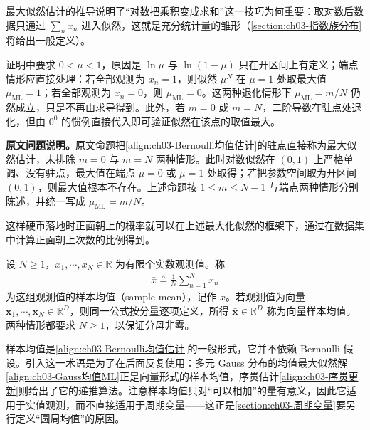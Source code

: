 \documentclass[../../main.tex]{subfiles}
\begin{document}
\begin{remark}
最大似然估计的推导说明了“对数把乘积变成求和”这一技巧为何重要：取对数后数据只通过 $\sum_n x_n$ 进入似然，这就是充分统计量的雏形（\cref{section:ch03-指数族分布}将给出一般定义）。

证明中要求 $0<\mu<1$，原因是 $\ln\mu$ 与 $\ln(1-\mu)$ 只在开区间上有定义；端点情形应直接处理：若全部观测为 $x_n=1$，则似然 $\mu^{N}$ 在 $\mu=1$ 处取最大值 $\mu_{\mathrm{ML}}=1$；若全部观测为 $x_n=0$，则 $\mu_{\mathrm{ML}}=0$。这两种退化情形下 $\mu_{\mathrm{ML}}=m/N$ 仍然成立，只是不再由求导得到。此外，若 $m=0$ 或 $m=N$，二阶导数在驻点处退化，但由 $0^{0}$ 的惯例直接代入即可验证似然在该点的取值最大。

\textbf{原文问题说明。}原文命题把\eqref{align:ch03-Bernoulli均值估计}的驻点直接称为最大似然估计，未排除 $m=0$ 与 $m=N$ 两种情形。此时对数似然在 $(0,1)$ 上严格单调、没有驻点，最大值在端点 $\mu=0$ 或 $\mu=1$ 处取得；若把参数空间取为开区间 $(0,1)$，则最大值根本不存在。上述命题按 $1\leqslant m\leqslant N-1$ 与端点两种情形分别陈述，并统一写成 $\mu_{\mathrm{ML}}=m/N$。
\end{remark}

这样硬币落地时正面朝上的概率就可以在上述最大化似然的框架下，通过在数据集中计算正面朝上次数的比例得到。

\begin{definition}[样本均值]\label{definition:ch03-样本均值}
设 $N\geqslant1$，$x_1,\cdots,x_N\in\mathbb{R}$ 为有限个实数观测值。称
\begin{align}
\bar{x}\triangleq\frac{1}{N}\sum_{n=1}^{N}x_n
\label{align:ch03-样本均值}
\end{align}
为这组观测值的样本均值（sample mean），记作 $\bar{x}$。若观测值为向量 $\boldsymbol{x}_1,\cdots,\boldsymbol{x}_N\in\mathbb{R}^{D}$，则同一公式按分量逐项定义，所得 $\bar{\boldsymbol{x}}\in\mathbb{R}^{D}$ 称为向量样本均值。两种情形都要求 $N\geqslant1$，以保证分母非零。
\end{definition}

\begin{remark}
样本均值是\eqref{align:ch03-Bernoulli均值估计}的一般形式，它并不依赖 Bernoulli 假设。引入这一术语是为了在后面反复使用：多元 Gauss 分布的均值最大似然解\eqref{align:ch03-Gauss均值ML}正是向量形式的样本均值，序贯估计\eqref{align:ch03-序贯更新}则给出了它的递推算法。注意样本均值只对“可以相加”的量有意义，因此它适用于实值观测，而不直接适用于周期变量——这正是\cref{section:ch03-周期变量}要另行定义“圆周均值”的原因。
\end{remark}
\end{document}
